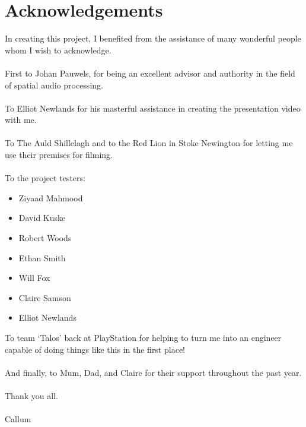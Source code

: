 \thispagestyle{plain}
\newpage
\appendix
\section{Acknowledgements}\label{sec:acknowledgements}

\normalsize

In creating this project, I benefited from the assistance of many wonderful people whom I wish to acknowledge.
\\~\\
First to Johan Pauwels, for being an excellent advisor and authority in the field of spatial audio processing.
\\~\\
To Elliot Newlands for his masterful assistance in creating the presentation video with me.
\\~\\
To The Auld Shillelagh and to the Red Lion in Stoke Newington for letting me use their premises for filming.
\\~\\
To the project testers:
\begin{itemize}
    \item Ziyaad Mahmood
    \item David Kuske
    \item Robert Woods
    \item Ethan Smith
    \item Will Fox
    \item Claire Samson
    \item Elliot Newlands
\end{itemize}

To team `Talos'
back at PlayStation for helping to turn me into an engineer capable of doing things like this in the first place!
\\~\\
And finally, to Mum, Dad, and Claire for their support throughout the past year.
\\~\\
Thank you all.
\\~\\
Callum